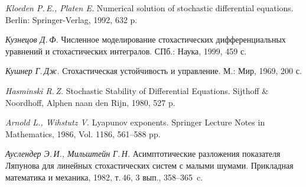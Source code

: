 \begin{thebibliography}{wlab}
\emph{Kloeden P.\,E., Platen E.}
\newblock Numerical solution of stochastic differential equations.
\newblock Berlin: Springer-Verlag, 1992, 632 p.

\emph{Кузнецов Д.\,Ф.}
\newblock Численное моделирование стохастических дифференциальных уравнений и стохастических интегралов.
\newblock СПб.: Наука, 1999, 459 с.

\emph{Кушнер Г.\,Дж.}
\newblock Стохастическая устойчивость и управление.
\newblock М.: Мир, 1969, 200 с.

\emph{Hasminski R.\,Z.}
\newblock Stochastic Stability of Differential Equations.
\newblock Sijthoff \& Noordhoff, Alphen naan den Rijn, 1980, 527 p.

\emph{Arnold L., Wihstutz V.}
\newblock Lyapunov exponents.
\newblock Springer Lecture Notes in Mathematics, 1986, Vol. 1186, 561--588 pp.

\emph{Ауслендер Э.\,И., Мильштейн Г.\,Н.}
\newblock Асимптотические разложения показателя Ляпунова для линейных стохастических систем с малыми шумами.
\newblock Прикладная математика и механика, 1982, т.\,46, 3 вып., 358--365~c.

\end{thebibliography}

